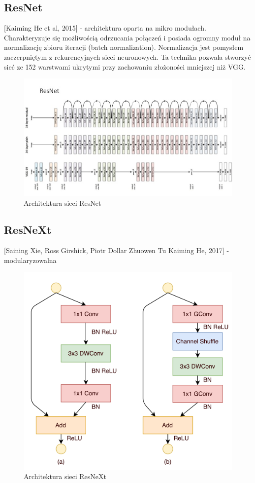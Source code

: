 \documentclass[12pt,a4paper,twoside,titlepage,openright]{book}
\begin{document}
\subsection{ResNet}
[Kaiming He et al, 2015]  - architektura oparta na mikro modułach. Charakteryzuje się możliwością odrzucania połączeń i posiada ogromny moduł na normalizację zbioru iteracji (batch normalization). Normalizacja jest pomysłem zaczerpniętym z rekurencyjnych sieci neuronowych. Ta technika pozwala stworzyć sieć ze 152 warstwami ukrytymi przy zachowaniu złożoności mniejszej niż VGG. \cite{DBLP:journals/corr/XieGDTH16}
\begin{figure}[h]
	\centering
			\includegraphics[resolution=100]{ResNet.png}
		\caption{Architektura sieci ResNet}
\end{figure}

\subsection{ResNeXt}
[Saining Xie, Ross Girshick, Piotr Dollar Zhuowen Tu Kaiming He, 2017] - modularyzowalna 
\cite{DBLP:journals/corr/XieGDTH16}
\begin{figure}[h]
	\centering
			\includegraphics[resolution=120]{ResNeXt.png}
		\caption{Architektura sieci ResNeXt}
\end{figure}
\end{document}
